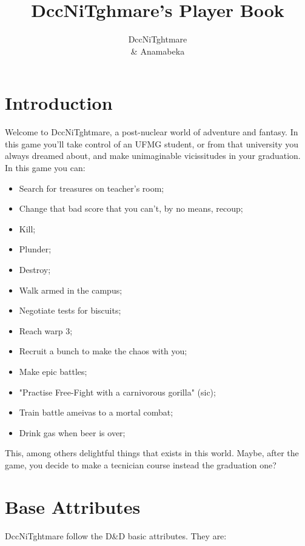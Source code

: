 \documentclass[ letterpaper,12pt]{article}
\begin{document}
\title{\textbf{DccNiTghmare's Player Book}}

\author{
DccNiTghtmare\\ \& Anamabeka
}

\maketitle
{}

\newpage

\tableofcontents

\newpage
\section{Introduction}

Welcome to DccNiTghtmare, a post-nuclear world of adventure and fantasy. In this
game you'll take control of an UFMG student, or from that university you always
dreamed about, and make unimaginable vicissitudes in your graduation. In this
game you can:

\begin{itemize}
\item{Search for treasures on teacher's room;}
\item{Change that bad score that you can't, by no means, recoup;}
\item{Kill;}
\item{Plunder;}
\item{Destroy;}
\item{Walk armed in the campus;}
\item{Negotiate tests for biscuits;}
\item{Reach warp 3;}
\item{Recruit a bunch to make the chaos with you;}
\item{Make epic battles;}
\item{"Practise Free-Fight with a carnivorous gorilla" (sic);}
\item{Train battle ameivas to a mortal combat;}
\item{Drink gas when beer is over;}
\end{itemize}

This, among others delightful things that exists in this world. Maybe, after the game, you decide to make a tecnician course instead the graduation one?

\section{Base Attributes}
DccNiTghtmare follow the D\&D basic attributes. They are:
\end{document}
